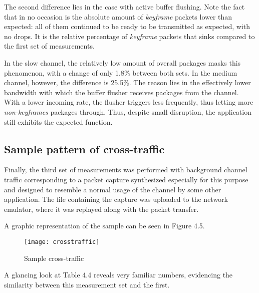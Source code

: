 The second difference lies in the case with active buffer flushing. Note the fact that in no occasion is the absolute amount of \textit{keyframe} packets lower than expected: all of them continued to be ready to be transmitted as expected, with no drops. It is the relative percentage of \textit{keyframe} packets that sinks compared to the first set of measurements.

In the slow channel, the relatively low amount of overall packages masks this phenomenon, with a change of only 1.8\% between both sets. In the medium channel, however, the difference is 25.5\%. The reason lies in the effectively lower bandwidth with which the buffer flusher receives packages from the channel. With a lower incoming rate, the flusher triggers less frequently, thus letting more \textit{non-keyframes} packages through. Thus, despite small disruption, the application still exhibits the expected function.

\clearpage

\subsection{Sample pattern of cross-traffic}

Finally, the third set of measurements was performed with background channel traffic corresponding to a packet capture synthesized especially for this purpose and designed to resemble a normal usage of the channel by some other application. The file containing the capture was uploaded to the network emulator, where it was replayed along with the packet transfer. 

A graphic representation of the sample can be seen in Figure 4.5.

\begin{figure}[!ht]
\caption{Sample cross-traffic}
\centering
\texttt{[image: crosstraffic]}
\end{figure}

A glancing look at Table 4.4 reveals very familiar numbers, evidencing the similarity between this measurement set and the first.

